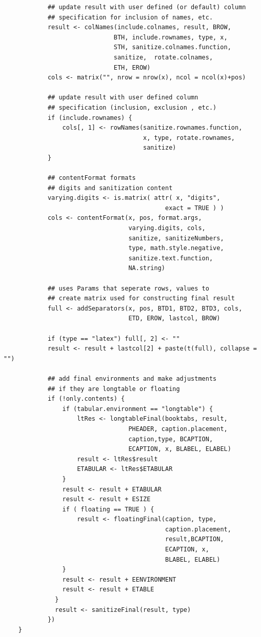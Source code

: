 \documentclass{memoir}\usepackage[]{graphicx}\usepackage[]{color}
\begin{document}
\begin{lstlisting}
            ## update result with user defined (or default) column 
            ## specification for inclusion of names, etc.
            result <- colNames(include.colnames, result, BROW, 
                              BTH, include.rownames, type, x, 
                              STH, sanitize.colnames.function, 
                              sanitize,  rotate.colnames, 
                              ETH, EROW)                              
            cols <- matrix("", nrow = nrow(x), ncol = ncol(x)+pos)

            ## update result with user defined column 
            ## specification (inclusion, exclusion , etc.)
            if (include.rownames) {
                cols[, 1] <- rowNames(sanitize.rownames.function, 
                                      x, type, rotate.rownames,
                                      sanitize)   
            }

            ## contentFormat formats 
            ## digits and sanitization content
            varying.digits <- is.matrix( attr( x, "digits", 
                                            exact = TRUE ) )
            cols <- contentFormat(x, pos, format.args, 
                                  varying.digits, cols, 
                                  sanitize, sanitizeNumbers, 
                                  type, math.style.negative, 
                                  sanitize.text.function, 
                                  NA.string) 

            ## uses Params that seperate rows, values to 
            ## create matrix used for constructing final result
            full <- addSeparators(x, pos, BTD1, BTD2, BTD3, cols, 
                                  ETD, EROW, lastcol, BROW)

            if (type == "latex") full[, 2] <- ""
            result <- result + lastcol[2] + paste(t(full), collapse = "")

            ## add final environments and make adjustments 
            ## if they are longtable or floating
            if (!only.contents) {
                if (tabular.environment == "longtable") {
                    ltRes <- longtableFinal(booktabs, result, 
                                  PHEADER, caption.placement, 
                                  caption,type, BCAPTION, 
                                  ECAPTION, x, BLABEL, ELABEL)  
                    result <- ltRes$result
                    ETABULAR <- ltRes$ETABULAR
                }
                result <- result + ETABULAR
                result <- result + ESIZE
                if ( floating == TRUE ) {
                    result <- floatingFinal(caption, type, 
                                            caption.placement, 
                                            result,BCAPTION, 
                                            ECAPTION, x, 
                                            BLABEL, ELABEL)
                }
                result <- result + EENVIRONMENT
                result <- result + ETABLE
              }
              result <- sanitizeFinal(result, type)
            })
    }
\end{lstlisting}
\end{document}
